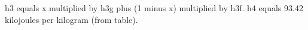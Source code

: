 h3 equals x multiplied by h3g plus (1 minus x) multiplied by h3f.  
h4 equals 93.42 kilojoules per kilogram (from table).